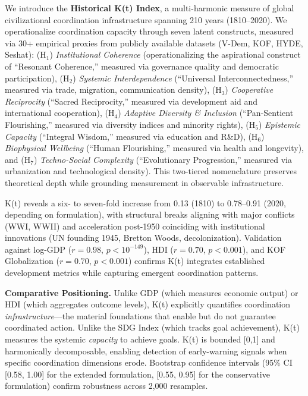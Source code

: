 \documentclass[11pt,letterpaper]{article}
\begin{document}
We introduce the \textbf{Historical K(t) Index}, a multi-harmonic measure of global civilizational coordination infrastructure spanning 210 years (1810--2020). We operationalize coordination capacity through seven latent constructs, measured via 30+ empirical proxies from publicly available datasets (V-Dem, KOF, HYDE, Seshat): (H$_1$) \textit{Institutional Coherence} (operationalizing the aspirational construct of ``Resonant Coherence,'' measured via governance quality and democratic participation), (H$_2$) \textit{Systemic Interdependence} (``Universal Interconnectedness,'' measured via trade, migration, communication density), (H$_3$) \textit{Cooperative Reciprocity} (``Sacred Reciprocity,'' measured via development aid and international cooperation), (H$_4$) \textit{Adaptive Diversity \& Inclusion} (``Pan-Sentient Flourishing,'' measured via diversity indices and minority rights), (H$_5$) \textit{Epistemic Capacity} (``Integral Wisdom,'' measured via education and R\&D), (H$_6$) \textit{Biophysical Wellbeing} (``Human Flourishing,'' measured via health and longevity), and (H$_7$) \textit{Techno-Social Complexity} (``Evolutionary Progression,'' measured via urbanization and technological density). This two-tiered nomenclature preserves theoretical depth while grounding measurement in observable infrastructure.

K(t) reveals a six- to seven-fold increase from 0.13 (1810) to 0.78--0.91 (2020, depending on formulation), with structural breaks aligning with major conflicts (WWI, WWII) and acceleration post-1950 coinciding with institutional innovations (UN founding 1945, Bretton Woods, decolonization). Validation against log-GDP ($r=0.98$, $p<10^{-149}$), HDI ($r=0.70$, $p<0.001$), and KOF Globalization ($r=0.70$, $p<0.001$) confirms K(t) integrates established development metrics while capturing emergent coordination patterns.

\textbf{Comparative Positioning.} Unlike GDP (which measures economic output) or HDI (which aggregates outcome levels), K(t) explicitly quantifies coordination \textit{infrastructure}---the material foundations that enable but do not guarantee coordinated action. Unlike the SDG Index (which tracks goal achievement), K(t) measures the systemic \textit{capacity} to achieve goals. K(t) is bounded [0,1] and harmonically decomposable, enabling detection of early-warning signals when specific coordination dimensions erode. Bootstrap confidence intervals (95\% CI [0.58, 1.00] for the extended formulation, [0.55, 0.95] for the conservative formulation) confirm robustness across 2,000 resamples.
\end{document}
